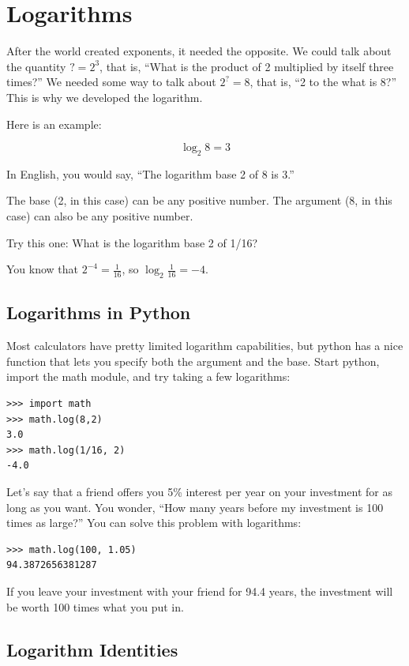 \chapter{Logarithms}

After the world created exponents, it needed the opposite. We
could talk about the quantity $? = 2^3$, that is, ``What is the
product of 2 multiplied by itself three times?''  We needed some way
to talk about $2^? = 8$, that is, ``2 to the what is 8?'' This is why we
developed the logarithm. 

Here is an example:

$$\log_{2}8 = 3$$

In English, you would say, ``The logarithm base 2 of 8 is 3.''

The base (2, in this case) can be any positive number. The argument
(8, in this case) can also be any positive number.

Try this one: What is the logarithm base 2 of 1/16?

You know that $2^{-4} = \frac{1}{16}$, so $\log_{2} \frac{1}{16} = -4$.

\section{Logarithms in Python}

Most calculators have pretty limited logarithm capabilities, but
python has a nice  function that lets you specify both
the argument and the base. Start python, import the math module, and try taking a few logarithms:

\begin{Verbatim}
>>> import math
>>> math.log(8,2)
3.0
>>> math.log(1/16, 2)
-4.0
\end{Verbatim}

Let's say that a friend offers you 5\% interest per year on your
investment for as long as you want. You wonder, ``How many years
before my investment is 100 times as large?'' You can solve this problem with logarithms:

\begin{Verbatim}
>>> math.log(100, 1.05)
94.3872656381287
\end{Verbatim}

If you leave your investment with your friend for 94.4 years, the
investment will be worth 100 times what you put in.

\section{Logarithm Identities}

